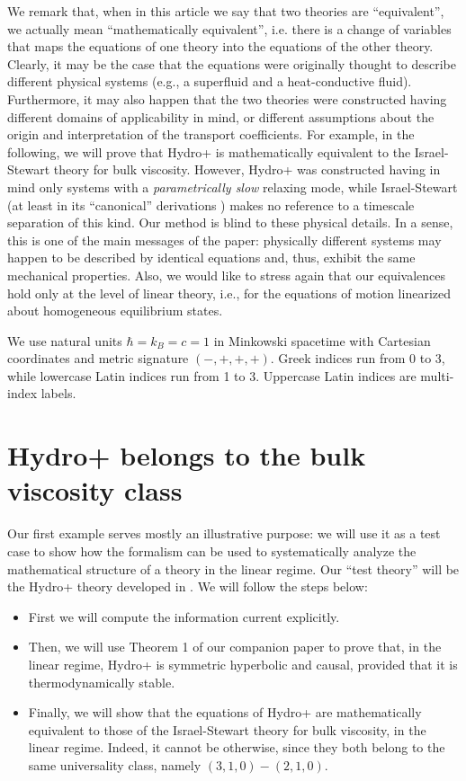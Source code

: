 \documentclass[a4paper, amsfonts, amssymb, amsmath, reprint, showkeys, nofootinbib, twoside, onecolumn,notitlepage]{revtex4-1}
\begin{document}
We remark that, when in this article we say that two theories are ``equivalent'', we actually mean ``mathematically equivalent'', i.e. there is a change of variables that maps the equations of one theory into the equations of the other theory. Clearly, it may be the case that the equations were originally thought to describe different physical systems (e.g., a superfluid and a heat-conductive fluid). Furthermore, it may also happen that the two theories were constructed having different domains of applicability in mind, or different assumptions about the origin and interpretation of the transport coefficients. For example, in the following, we will prove that Hydro+ is mathematically equivalent to the Israel-Stewart theory for bulk viscosity. However, Hydro+ \cite{Hydro+2018} was constructed having in mind only systems with a \textit{parametrically slow} relaxing mode, while Israel-Stewart (at least in its ``canonical'' derivations  \cite{Israel_Stewart_1979,Hishcock1983,Baier2008,DMNR2012}) makes no reference to a timescale separation of this kind. Our method is blind to these physical details. In a sense, this is one of the main messages of the paper: physically different systems may happen to be described by identical equations and, thus, exhibit the same mechanical properties. Also, we would like to stress again that our equivalences hold only at the level of linear theory, i.e., for the equations of motion linearized about homogeneous equilibrium states.


We use natural units $\hbar=k_B = c=1$ in Minkowski spacetime with Cartesian coordinates and metric signature $(-,+,+,+)$. Greek indices run from 0 to 3, while lowercase Latin indices run from 1 to 3. Uppercase Latin indices are multi-index labels.



\section{Hydro+ belongs to the bulk viscosity class}\label{sec:hydroplus}

Our first example serves mostly an illustrative purpose: we will use it as a test case to show how the formalism can be used to systematically analyze the mathematical structure of a theory in the linear regime. Our ``test theory'' will be the Hydro+ theory developed in  \cite{Hydro+2018}. We will follow the steps below:
\begin{itemize}
\item First we will compute the information current explicitly. 
\item Then, we will use Theorem 1 of our companion paper to prove that, in the linear regime, Hydro+ is symmetric hyperbolic and causal, provided that it is thermodynamically stable.
\item Finally, we will show that the equations of Hydro+ are mathematically equivalent to those of the Israel-Stewart theory for bulk viscosity, in the linear regime. Indeed, it cannot be otherwise, since they both belong to the same universality class, namely $(3,1,0)-(2,1,0)$.
\end{itemize} 
\end{document}

